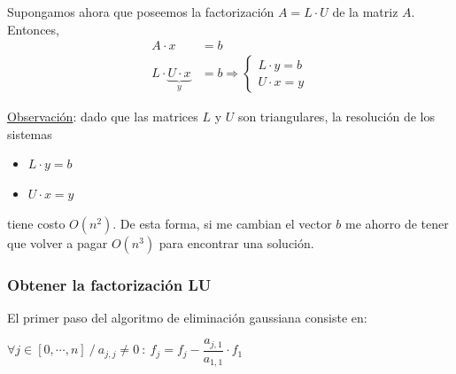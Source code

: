 \documentclass[]{article}
\begin{document}
Supongamos ahora que poseemos la factorización $A = L \cdot U$ de la matriz $A$. Entonces,
\begin{align*}
	A\cdot x &= b\\
	L\cdot \underbrace{U\cdot x}_{y} &= b \Rightarrow \begin{cases}
					L\cdot y = b \\
					U\cdot x = y
	\end{cases}
\end{align*}

\underline{Observación}: dado que las matrices $L$ y $U$ son triangulares, la resolución de los sistemas
\begin{itemize}
	\item $L\cdot y = b$
	\item $U\cdot x = y$
\end{itemize}
tiene costo $O(n^2)$. De esta forma, si me cambian el vector $b$ me ahorro de tener que volver a pagar $O(n^3)$ para encontrar una solución.

\subsubsection{Obtener la factorización LU} %

El primer paso del algoritmo de eliminación gaussiana consiste en:
\begin{center}
	$\forall j\in [0,\cdots,n]\ /\ a_{j,j}\neq 0 \ : \ f_j = f_j - \dfrac{a_{j,1}}{a_{1,1}}\cdot f_1$
\end{center}
\end{document}
